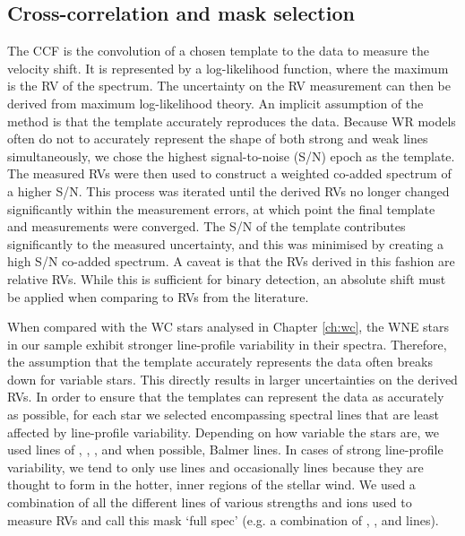 \subsection{Cross-correlation and mask selection}
The CCF is the convolution of a chosen template to the data to measure the velocity shift. It is represented by a log-likelihood function, where the maximum is the RV of the spectrum. The uncertainty on the RV measurement can then be derived from maximum log-likelihood theory. An implicit assumption of the method is that the template accurately reproduces the data. Because WR models often do not to accurately represent the shape of both strong and weak lines simultaneously, we chose the highest signal-to-noise (S/N) epoch as the template. The measured RVs were then used to construct a weighted co-added spectrum of a higher S/N. This process was iterated until the derived RVs no longer changed significantly within the measurement errors, at which point the final template and measurements were converged. The S/N of the template contributes significantly to the measured uncertainty, and this was minimised by creating a high S/N co-added spectrum. A caveat is that the RVs derived in this fashion are relative RVs. While this is sufficient for binary detection, an absolute shift must be applied when comparing to RVs from the literature. 

When compared with the WC stars analysed in Chapter \ref{ch:wc}, the WNE stars in our sample exhibit stronger line-profile variability in their spectra. Therefore, the assumption that the template accurately represents the data often breaks down for variable stars. This directly results in larger uncertainties on the derived RVs. In order to ensure that the templates can represent the data as accurately as possible, for each star we selected encompassing spectral lines that are least affected by line-profile variability. Depending on how variable the stars are, we used lines of \niv, \nv, \heii,{} and when possible, Balmer lines. In cases of strong line-profile variability, we tend to only use \nv{} lines and occasionally \niv{} lines because they are thought to form in the hotter, inner regions of the stellar wind. We used a combination of all the different lines of various strengths and ions used to measure RVs and call this mask `full spec' (e.g. a combination of \nv{}, \niv,{} and \heii{} lines).

